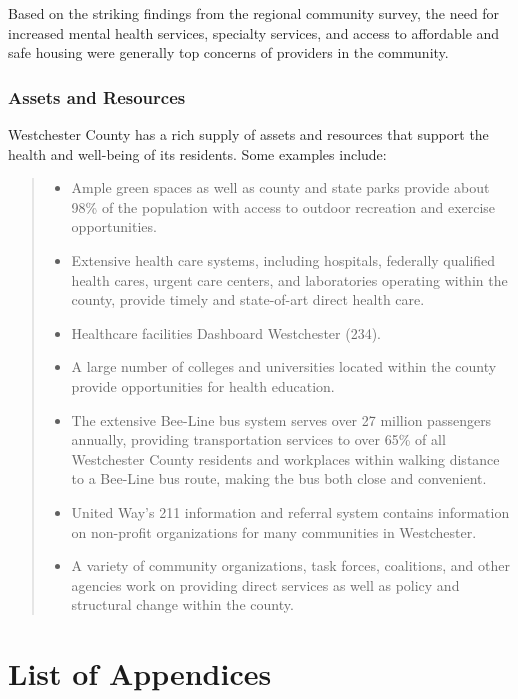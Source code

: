 \documentclass[
  english,
  letterpaper,
]{report}
\providecommand{\tightlist}{%
  \setlength{\itemsep}{0pt}\setlength{\parskip}{0pt}}
\begin{document}
Based on the striking findings from the regional community survey, the
need for increased mental health services, specialty services, and
access to affordable and safe housing were generally top concerns of
providers in the community.

\subsection{Assets and Resources}\label{assets-and-resources-5}

Westchester County has a rich supply of assets and resources that
support the health and well-being of its residents. Some examples
include:

\begin{quote}
\begin{itemize}
\tightlist
\item
  Ample green spaces as well as county and state parks provide about
  98\% of the population with access to outdoor recreation and exercise
  opportunities.
\item
  Extensive health care systems, including hospitals, federally
  qualified health cares, urgent care centers, and laboratories
  operating within the county, provide timely and state-of-art direct
  health care.
\item
  Healthcare facilities Dashboard Westchester (234).
\item
  A large number of colleges and universities located within the county
  provide opportunities for health education.
\item
  The extensive Bee-Line bus system serves over 27 million passengers
  annually, providing transportation services to over 65\% of all
  Westchester County residents and workplaces within walking distance to
  a Bee-Line bus route, making the bus both close and convenient.
\item
  United Way's 211 information and referral system contains information
  on non-profit organizations for many communities in Westchester.
\item
  A variety of community organizations, task forces, coalitions, and
  other agencies work on providing direct services as well as policy and
  structural change within the county.
\end{itemize}
\end{quote}


\chapter{List of Appendices}\label{list-of-appendices}
\end{document}
